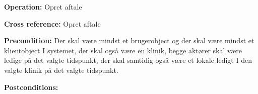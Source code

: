 \textbf{Operation:} Opret aftale 

\textbf{Cross reference:} Opret aftale 

\textbf{Precondition:} Der skal være mindst et brugerobject og der skal være mindst et klientobject I systemet, der skal også være en klinik, begge aktører skal være ledige på det valgte tidspunkt, der skal samtidig også være et lokale ledigt I den valgte klinik på det valgte tidspunkt. 

\textbf{Postconditions:}   